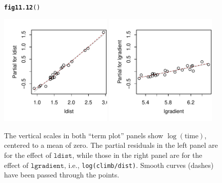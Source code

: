 \documentclass[12pt, a4paper,  BCOR=8.25mm, DIV=15]{scrartcl}\usepackage[]{graphicx}\usepackage[]{color}
\makeatletter
\newcommand{\hlstd}[1]{\textcolor[rgb]{0.345,0.345,0.345}{#1}}%
\newcommand{\hlkwd}[1]{\textcolor[rgb]{0.737,0.353,0.396}{\textbf{#1}}}%
\newenvironment{kframe}{%
 \def\at@end@of@kframe{}%
 \ifinner\ifhmode%
  \def\at@end@of@kframe{\end{minipage}}%
  \begin{minipage}{\columnwidth}%
 \fi\fi%
 \def\FrameCommand##1{\hskip\@totalleftmargin \hskip-\fboxsep
 \colorbox{shadecolor}{##1}\hskip-\fboxsep
     \hskip-\linewidth \hskip-\@totalleftmargin \hskip\columnwidth}%
 \MakeFramed {\advance\hsize-\width
   \@totalleftmargin\z@ \linewidth\hsize
   \@setminipage}}%
 {\par\unskip\endMakeFramed%
 \at@end@of@kframe}
\newenvironment{knitrout}{}{} %
\newcommand{\txtt}[1]{{\texttt{#1}}}
\makeatother
\begin{document}
\begin{figure}[H]
\begin{knitrout}
\color{fgcolor}\begin{kframe}
\begin{alltt}
\hlkwd{fig11.12}\hlstd{()}
\end{alltt}
\end{kframe}

{\centering \includegraphics[width=0.48\textwidth]{figs/reg-tplot-ni-11_12-1} 
\includegraphics[width=0.48\textwidth]{figs/reg-tplot-ni-11_12-2} 

}



\end{knitrout}
\caption{The vertical scales in both ``term plot'' panels show
  $\log(\mbox{time})$, centered to a mean of zero. The partial residuals
  in the left panel are for the effect of $\txtt{ldist}$, while those
  in the right panel are for the effect of $\txtt{lgradient}$, i.e.,
  \txtt{log(climb/dist)}. Smooth curves (dashes) have been passed
  through the points.\label{fig:lnihills-lin}}
\vspace*{-15pt}
\end{figure}
\end{document}
